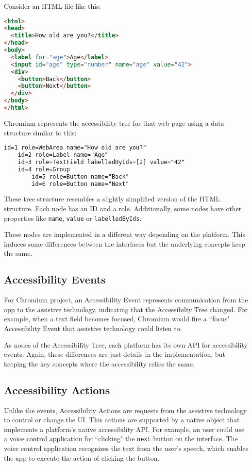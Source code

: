 Consider an HTML file like this:
\begin{lstlisting}[language=html]
<html>
<head>
  <title>How old are you?</title>
</head>
<body>
  <label for="age">Age</label>
  <input id="age" type="number" name="age" value="42">
  <div>
    <button>Back</button>
    <button>Next</button>
  </div>
</body>
</html>
\end{lstlisting}

Chromium represents the accessibility tree for that web page using a data structure similar to this:
\begin{lstlisting}[otherkeywords={id,role,name,labelledByIds,value}, language=html]
id=1 role=WebArea name="How old are you?"
    id=2 role=Label name="Age"
    id=3 role=TextField labelledByIds=[2] value="42"
    id=4 role=Group
        id=5 role=Button name="Back"
        id=6 role=Button name="Next"
\end{lstlisting}

These tree structure resembles a slightly simplified version of the HTML structure. Each node has an ID and a role. Additionally, some nodes have other properties like \texttt{name}, \texttt{value} or \texttt{labelledByIds}. 

These nodes are implemented in a different way depending on the platform. This induces some differences between the interfaces but the underlying concepts keep the same.

\subsection{Accessibility Events}

For Chromium project, an Accessibility Event represents communication from the app to the assistive technology, indicating that the Accessibilty Tree changed. For example, when a text field becomes focused, Chromium would fire a ``focus" Accessibility Event that assistive technology could listen to.

As nodes of the Accessibility Tree, each platform has its own API for accessibility events. Again, these differences are just details in the implementation, but keeping the key concepts where the accessibility relies the same.

\subsection{Accessibility Actions}

Unlike the events, Accessibility Actions are requests from the assistive technology to control or change the UI. This actions are supported by a native object that implements a platform's native accessibility API. For example, an user could use a voice control application for ``clicking" the \texttt{next} button on the interface. The voice control application recognizes the text from the user's speech, which enables the app to execute the action of clicking the button.

